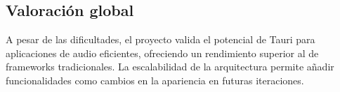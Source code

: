 \documentclass[11pt, a4paper]{article}
\begin{document}
        \subsection{Valoración global}

        A pesar de las dificultades, el proyecto valida el potencial de Tauri para aplicaciones de audio eficientes, ofreciendo un rendimiento superior al de frameworks tradicionales. La escalabilidad de la arquitectura permite añadir funcionalidades como cambios en la apariencia en futuras iteraciones.
\end{document}
